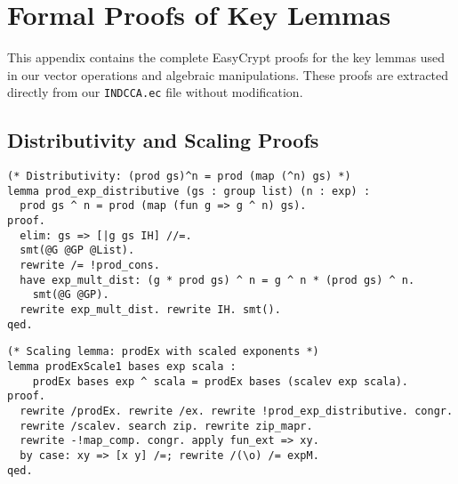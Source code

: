 \chapter{Formal Proofs of Key Lemmas}
\label{appendix:formal-proofs}



This appendix contains the complete EasyCrypt proofs for the key lemmas used in our vector operations and algebraic manipulations. These proofs are extracted directly from our \texttt{INDCCA.ec} file without modification.

\section{Distributivity and Scaling Proofs}
\label{sec:distributivity-proofs}


\begin{lstlisting}[style=easycrypt, caption=Proof of Product Exponentiation Distributivity, breaklines=true, breakatwhitespace=true, frame=single, keepspaces=true]
(* Distributivity: (prod gs)^n = prod (map (^n) gs) *)
lemma prod_exp_distributive (gs : group list) (n : exp) :
  prod gs ^ n = prod (map (fun g => g ^ n) gs).
proof.
  elim: gs => [|g gs IH] //=. 
  smt(@G @GP @List). 
  rewrite /= !prod_cons. 
  have exp_mult_dist: (g * prod gs) ^ n = g ^ n * (prod gs) ^ n. 
    smt(@G @GP).
  rewrite exp_mult_dist. rewrite IH. smt().
qed.
\end{lstlisting}

\begin{lstlisting}[style=easycrypt, caption=Proof of Scaling Consistency (Primary), breaklines=true, breakatwhitespace=true, frame=single, keepspaces=true]
(* Scaling lemma: prodEx with scaled exponents *)
lemma prodExScale1 bases exp scala :
    prodEx bases exp ^ scala = prodEx bases (scalev exp scala).
proof.
  rewrite /prodEx. rewrite /ex. rewrite !prod_exp_distributive. congr. 
  rewrite /scalev. search zip. rewrite zip_mapr. 
  rewrite -!map_comp. congr. apply fun_ext => xy.
  by case: xy => [x y] /=; rewrite /(\o) /= expM.
qed.
\end{lstlisting}

